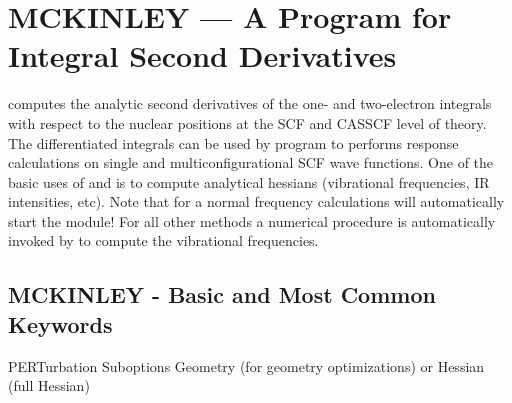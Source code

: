 \section{MCKINLEY --- A Program for Integral Second Derivatives}
\label{TUT:sec:mckinley}

 computes the analytic second derivatives of the one- and two-electron
integrals with respect to the nuclear positions at the SCF and CASSCF level of theory. 
The differentiated integrals
can be used by program  to performs response calculations on
single and multiconfigurational SCF wave functions. One of the basic uses
of  and  is to compute analytical hessians
(vibrational frequencies, IR intensities, etc).
Note that  for a normal frequency calculations will automatically
start the  module!
For all other methods a numerical procedure is automatically
invoked by  to compute the vibrational frequencies.

\subsection{MCKINLEY - Basic and Most Common Keywords}
\begin{keywordlist}
\item[PERTurbation] Suboptions Geometry (for geometry optimizations) or Hessian (full Hessian)
\item[]

\end{keywordlist}
